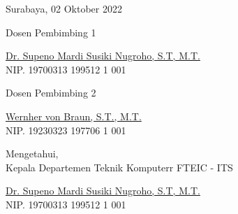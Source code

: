 \begin{flushright}
  Surabaya, 02 Oktober 2022
\end{flushright}
\vspace{1ex}

\begin{center}

  \begin{multicols}{2}

    Dosen Pembimbing 1
    \vspace{12ex}

    \underline{Dr. Supeno Mardi Susiki Nugroho, S.T, M.T.} \\
    NIP. 19700313 199512 1 001

    \columnbreak

    Dosen Pembimbing 2
    \vspace{12ex}

    \underline{Wernher von Braun, S.T., M.T.} \\
    NIP. 19230323 197706 1 001

  \end{multicols}
  \vspace{6ex}

  Mengetahui, \\
  Kepala Departemen Teknik Komputerr FTEIC - ITS
  \vspace{12ex}

  \underline{Dr. Supeno Mardi Susiki Nugroho, S.T, M.T.} \\
  NIP. 19700313 199512 1 001

\end{center}
